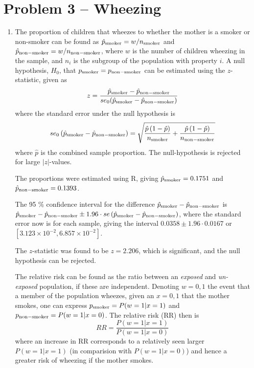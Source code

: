 \documentclass[a4paper,11pt]{article}
\begin{document}
\section*{Problem 3 -- Wheezing}
\begin{enumerate}[label=3\alph*)]
    \item  The proportion of children that wheezes to whether the mother is a smoker or non-smoker can be found as $\hat{p}_{\rm smoker} = w / n_{\rm smoker}$ and  $\hat{p}_{\rm non-smoker} = w / n_{\rm non-smoker}$, where $w$ is the number of children wheezing in the sample, and $n_i$ is the subgroup of the population with property $i$. A null hypothesis, $H_0$, that $p_{\rm smoker} = p_{\rm non-smoker}$ can be estimated using the $z$-statistic, given as
        \begin{equation}
            z = \frac{\hat{p}_{\rm smoker} - \hat{p}_{\rm non-smoker}}{se_0(\hat{p}_{\rm smoker} - \hat{p}_{\rm non-smoker} ) }
            \label{eq:z_statistic}
        \end{equation}
        where the standard error under the null hypothesis is
        \begin{equation}
            se_0 \left( \hat{p}_{\rm smoker} - \hat{p}_{\rm non-smoker} \right) = \sqrt{ \frac{\hat{p} \left( 1 - \hat{p} \right)}{n_{\rm smoker}} + \frac{\hat{p}\left( 1- \hat{p} \right)}{n_{\rm non-smoker}}  }
            \label{eq:se_0}
        \end{equation}
        where $\hat{p}$ is the combined sample proportion. The null-hypothesis is rejected for large $|z|$-values.

        The proportions were estimated using R, giving $\hat{p}_{\rm smoker} = 0.1751$ and $\hat{p}_{\rm non-smoker} = 0.1393$.

        The 95 \% confidence interval for the difference $\hat{p}_{\rm smoker} - \hat{p}_{\rm non-smoker}$ is $\hat{p}_{\rm smoker} - \hat{p}_{\rm non-smoker} \pm 1.96 \cdot se \left( \hat{p}_{\rm smoker} - \hat{p}_{\rm non-smoker} \right)$, where the standard error now is for each sample, giving the interval $0.0358 \pm 1.96 \cdot 0.0167$ or $[3.123 \times 10^{-2}, 6.857 \times 10^{-2}]$.

        The $z$-statistic was found to be $z = 2.206$, which is significant, and the null hypothesis can be rejected.

        The relative risk can be found as the ratio between an \textit{exposed} and \textit{un-exposed} population, if these are independent. Denoting $w = 0,1$ the event that a member of the population wheezes, given an $x = 0,1$ that the mother smokes, one can express $p_{\rm smoker} = P( w=1 | x=1 )$ and $p_{\rm non-smoker} = P( w=1 | x=0)$. The relative risk (RR) then is
        \begin{equation}
            RR = \frac{P\left( w=1 | x=1 \right)}{P\left( w=1 | x=0 \right)}
            \label{eq:RR}
        \end{equation}
        where an increase in RR corresponds to a relatively seen larger $P(w=1 | x=1)$ (in comparision with $P(w=1 | x=0)$) and hence a greater risk of wheezing if the mother smokes.


\end{enumerate}
\end{document}
